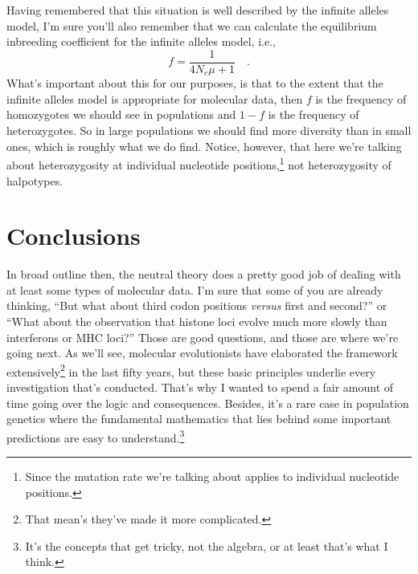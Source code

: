\documentclass[12pt]{article}
\begin{document}
Having remembered that this situation is well described by the
infinite alleles model, I'm sure you'll also remember that we can
calculate the equilibrium inbreeding coefficient for the infinite
alleles model, i.e.,
\[
f = \frac{1}{4N_e\mu + 1} \quad .
\]
What's important about this for our purposes, is that to the extent
that the infinite alleles model is appropriate for molecular data,
then $f$ is the frequency of homozygotes we should see in populations
and $1-f$ is the frequency of heterozygotes. So in large populations
we should find more diversity than in small ones, which is roughly
what we do find. Notice, however, that here we're talking about
heterozygosity at individual nucleotide positions,\footnote{Since the
  mutation rate we're talking about applies to individual nucleotide
  positions.} not heterozygosity of halpotypes.

\section*{Conclusions}

In broad outline then, the neutral theory does a pretty good job of
dealing with at least some types of molecular data. I'm sure that some
of you are already thinking, ``But what about third codon positions
{\it versus\/} first and second?'' or ``What about the observation
that histone loci evolve much more slowly than interferons or MHC
loci?''  Those are good questions, and those are where we're going
next. As we'll see, molecular evolutionists have elaborated the
framework extensively\footnote{That mean's they've made it more
  complicated.} in the last fifty years, but these basic principles
underlie every investigation that's conducted. That's why I wanted to
spend a fair amount of time going over the logic and
consequences. Besides, it's a rare case in population genetics where
the fundamental mathematics that lies behind some important
predictions are easy to understand.\footnote{It's the concepts that
  get tricky, not the algebra, or at least that's what I think.}




\ccLicense
\end{document}
